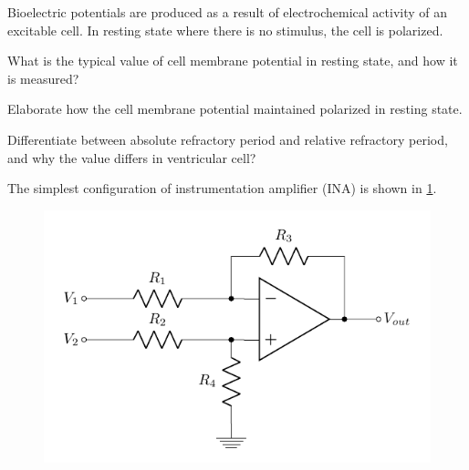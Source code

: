 \question{}

\listbeginx	%
	\item Bioelectric potentials are produced as a result of electrochemical activity of an excitable cell. In resting state where there is no stimulus, the cell is polarized.
	
	
	\listbegin
		\item What is the typical value of cell membrane potential in resting state, and how it is measured?
		
		
		
		\item Elaborate how the cell membrane potential maintained polarized in resting state.
		
		
		
		\item Differentiate between absolute refractory period and relative refractory period, and why the value differs in ventricular cell?
		
		
	\listclose 
	
	
	\item The simplest configuration of instrumentation amplifier (INA) is shown in \cref{fig:diffamp2}. 
	
	
	\begin{figure}[H] %
		\centering
		\includegraphics{diffamp}
		\caption{\rajah}
		\label{fig:diffamp2}
	\end{figure}

